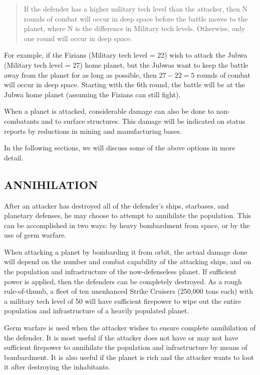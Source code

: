 \documentclass[10pt,titlepage]{article}
\begin{document}
\begin{quotation}
	If the defender has a higher military tech level than the attacker,
	then N rounds of combat will occur in deep space before the battle
	moves to the planet, where N is the difference in Military tech
	levels.  Otherwise, only one round will occur in deep space.\end{quotation} 

For example, if the Fizians (Military tech level = 22) wish to attack the Jubwa
(Military tech level = 27) home planet, but the Jubwas want to keep the battle
away from the planet for as long as possible, then $27-22 = 5$ rounds of combat
will occur in deep space.  Starting with the 6th round, the battle will be at
the Jubwa home planet (assuming the Fizians can still fight).

When a planet is attacked, considerable damage can also be done to non-
combatants and to surface structures.  This damage will be indicated on
status reports by reductions in mining and manufacturing bases.

In the following sections, we will discuss some of the above options in more
detail.


\subsection{ANNIHILATION}
\label{sec:annihilation}


After an attacker has destroyed all of the defender's ships, starbases, and
planetary defenses, he may choose to attempt to annihilate the population.
This can be accomplished in two ways: by heavy bombardment from space, or
by the use of germ warfare.

When attacking a planet by bombarding it from orbit, the actual damage done
will depend on the number and combat capability of the attacking ships, and on
the population and infrastructure of the now-defenseless planet.  If sufficient
power is applied, then the defenders can be completely destroyed.  As a rough
rule-of-thumb, a fleet of ten unenhanced Strike Cruisers (250,000 tons each)
with a military tech level of 50 will have sufficient firepower to wipe out
the entire population and infrastructure of a heavily populated planet.

Germ warfare is used when the attacker wishes to ensure complete annihilation
of the defender.  It is most useful if the attacker does not have or may not
have sufficient firepower to annihilate the population and infrastructure by
means of bombardment.  It is also useful if the planet is rich and the attacker
wants to loot it after destroying the inhabitants.
\end{document}
